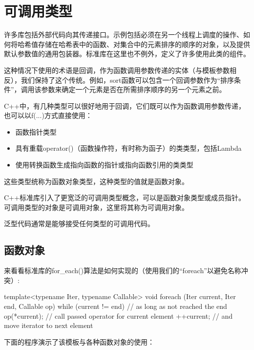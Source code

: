 \section{可调用类型}

许多库包括外部代码向其传递接口。示例包括必须在另一个线程上调度的操作、如何将哈希值存储在哈希表中的函数、对集合中的元素排序的顺序的对象，以及提供默认参数值的通用包装器。标准库在这里也不例外，定义了许多使用此类的组件。

这种情况下使用的术语是回调，作为函数调用参数传递的实体（与模板参数相反），我们保持了这个传统。例如，sort函数可以包含一个回调参数作为“排序条件”，调用该参数来确定一个元素是否在所需排序顺序的另一个元素之前。

C++中，有几种类型可以很好地用于回调，它们既可以作为函数调用参数传递，也可以以f(...)方式直接使用：

\begin{itemize}
\item
函数指针类型

\item
具有重载operator()（函数操作符，有时称为函子）的类类型，包括Lambda

\item
使用转换函数生成指向函数的指针或指向函数引用的类类型
\end{itemize}

这些类型统称为函数对象类型，这种类型的值就是函数对象。

C++标准库引入了更宽泛的可调用类型概念，可以是函数对象类型或成员指针。可调用类型的对象是可调用对象，这里将其称为可调用对象。

泛型代码通常是能够接受任何类型的可调用代码。

\subsection{函数对象}

来看看标准库的for\_each()算法是如何实现的（使用我们的“foreach”以避免名称冲突）:

\begin{cpp}
template<typename Iter, typename Callable>
void foreach (Iter current, Iter end, Callable op) {
	while (current != end) { // as long as not reached the end
		op(*current); // call passed operator for current element
		++current; // and move iterator to next element
	}
}
\end{cpp}

下面的程序演示了该模板与各种函数对象的使用：

